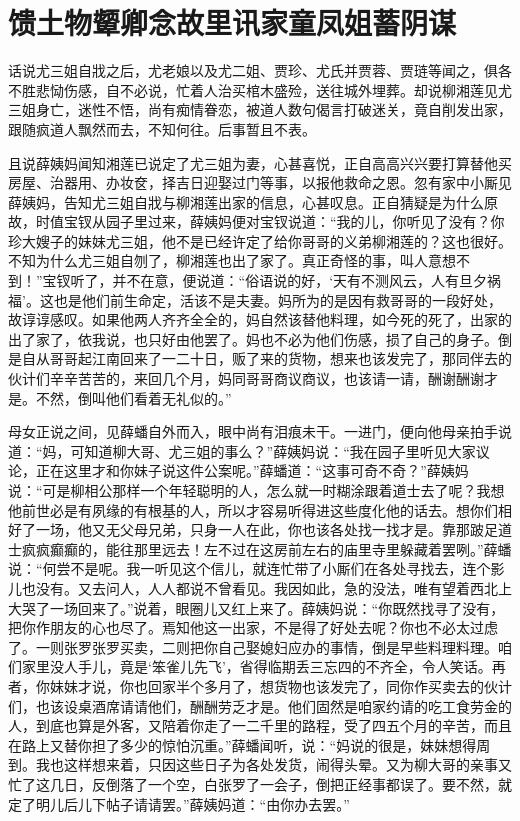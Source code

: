 
\chapter{馈土物颦卿念故里\hspace{.5em}讯家童凤姐蓄阴谋}
话说尤三姐自戕之后，尤老娘以及尤二姐、贾珍、尤氏并贾蓉、贾琏等闻之，俱各不胜悲恸伤感，自不必说，忙着人治买棺木盛殓，送往城外埋葬。却说柳湘莲见尤三姐身亡，迷性不悟，尚有痴情眷恋，被道人数句偈言打破迷关，竟自削发出家，跟随疯道人飘然而去，不知何往。后事暂且不表。

且说薛姨妈闻知湘莲已说定了尤三姐为妻，心甚喜悦，正自高高兴兴要打算替他买房屋、治器用、办妆奁，择吉日迎娶过门等事，以报他救命之恩。忽有家中小厮见薛姨妈，告知尤三姐自戕与柳湘莲出家的信息，心甚叹息。正自猜疑是为什么原故，时值宝钗从园子里过来，薛姨妈便对宝钗说道：``我的儿，你听见了没有？你珍大嫂子的妹妹尤三姐，他不是已经许定了给你哥哥的义弟柳湘莲的？这也很好。不知为什么尤三姐自刎了，柳湘莲也出了家了。真正奇怪的事，叫人意想不到！''宝钗听了，并不在意，便说道：``俗语说的好，`天有不测风云，人有旦夕祸福'。这也是他们前生命定，活该不是夫妻。妈所为的是因有救哥哥的一段好处，故谆谆感叹。如果他两人齐齐全全的，妈自然该替他料理，如今死的死了，出家的出了家了，依我说，也只好由他罢了。妈也不必为他们伤感，损了自己的身子。倒是自从哥哥起江南回来了一二十日，贩了来的货物，想来也该发完了，那同伴去的伙计们辛辛苦苦的，来回几个月，妈同哥哥商议商议，也该请一请，酬谢酬谢才是。不然，倒叫他们看着无礼似的。''

母女正说之间，见薛蟠自外而入，眼中尚有泪痕未干。一进门，便向他母亲拍手说道：``妈，可知道柳大哥、尤三姐的事么？''薛姨妈说：``我在园子里听见大家议论，正在这里才和你妹子说这件公案呢。''薛蟠道：``这事可奇不奇？''薛姨妈说：``可是柳相公那样一个年轻聪明的人，怎么就一时糊涂跟着道士去了呢？我想他前世必是有夙缘的有根基的人，所以才容易听得进这些度化他的话去。想你们相好了一场，他又无父母兄弟，只身一人在此，你也该各处找一找才是。靠那跛足道士疯疯癫癫的，能往那里远去！左不过在这房前左右的庙里寺里躲藏着罢咧。''薛蟠说：``何尝不是呢。我一听见这个信儿，就连忙带了小厮们在各处寻找去，连个影儿也没有。又去问人，人人都说不曾看见。我因如此，急的没法，唯有望着西北上大哭了一场回来了。''说着，眼圈儿又红上来了。薛姨妈说：``你既然找寻了没有，把你作朋友的心也尽了。焉知他这一出家，不是得了好处去呢？你也不必太过虑了。一则张罗张罗买卖，二则把你自己娶媳妇应办的事情，倒是早些料理料理。咱们家里没人手儿，竟是`笨雀儿先飞'，省得临期丢三忘四的不齐全，令人笑话。再者，你妹妹才说，你也回家半个多月了，想货物也该发完了，同你作买卖去的伙计们，也该设桌酒席请请他们，酬酬劳乏才是。他们固然是咱家约请的吃工食劳金的人，到底也算是外客，又陪着你走了一二千里的路程，受了四五个月的辛苦，而且在路上又替你担了多少的惊怕沉重。''薛蟠闻听，说：``妈说的很是，妹妹想得周到。我也这样想来着，只因这些日子为各处发货，闹得头晕。又为柳大哥的亲事又忙了这几日，反倒落了一个空，白张罗了一会子，倒把正经事都误了。要不然，就定了明儿后儿下帖子请请罢。''薛姨妈道：``由你办去罢。''


